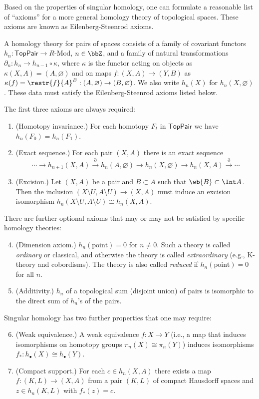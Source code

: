 Based on the properties of singular homology, one can formulate a reasonable list of ``axioms'' for a more general homology theory of topological spaces. These axioms are known as Eilenberg-Steenrod axioms.

\begin{defn}
    A homology theory for pairs of spaces consists of a family of covariant functors $h_n:\mathsf{TopPair}\to R\text{-Mod}$, $n\in\bbZ$, and a family of natural transformations $\partial_n:h_n\to h_{n-1}\circ\kappa$, where $\kappa$ is the functor acting on objects as $\kappa(X,A)=(A,\varnothing)$ and on maps $f:(X,A)\to (Y,B)$ as $\kappa(f)=\restr{f}{A}^B:(A,\varnothing)\to (B,\varnothing)$. We also write $h_n(X)$ for $h_n(X,\varnothing)$. These data must satisfy the Eilenberg-Steenrod axioms listed below.
\end{defn}

The first three axioms are always required:
\begin{enumerate}
    \item (Homotopy invariance.) For each homotopy $F_t$ in $\mathsf{TopPair}$ we have $h_n(F_0)=h_n(F_1)$.
    \item (Exact sequence.) For each pair $(X,A)$ there is an exact sequence
    \[\cdots\to h_{n+1}(X,A)\overset{\partial}\to h_n(A,\varnothing)\to h_n(X,\varnothing)\to h_n(X,A)\overset\partial\to\cdots\]
    \item (Excision.) Let $(X,A)$ be a pair and $B\subset A$ such that $\wb{B}\subset \Int A$. Then the inclusion $(X\setminus U,A\setminus U)\to (X,A)$ must induce an excision isomorphism $h_n(X\setminus U,A\setminus U)\cong h_n(X,A)$.
\end{enumerate}

There are further optional axioms that may or may not be satisfied by specific homology theories:
\begin{enumerate}
    \setcounter{enumi}{3}
    \item (Dimension axiom.) $h_n(\text{point})=0$ for $n\neq 0$. Such a theory is called \emph{ordinary} or classical, and otherwise the theory is called \emph{extraordinary} (e.g., K-theory and cobordisms). The theory is also called \emph{reduced} if $h_n(\text{point})=0$ for all $n$.
    \item (Additivity.) $h_n$ of a topological sum (disjoint union) of pairs is isomorphic to the direct sum of $h_n$'s of the pairs.
\end{enumerate}
Singular homology has two further properties that one may require:
\begin{enumerate}
    \setcounter{enumi}{5}
     \item (Weak equivalence.) A weak equivalence $f:X\to Y$ (i.e., a map that induces isomorphisms on homotopy groups $\pi_n(X)\cong \pi_n(Y)$) induces isomorphisms $f_\ast:h_\bullet(X)\cong h_\bullet(Y)$.
    \item (Compact support.)  For each $c\in h_n(X,A)$ there exists a map $f:(K,L)\to (X,A)$ from a pair $(K,L)$ of compact Hausdorff spaces and $z\in h_n(K,L)$ with $f_\ast(z)=c$.
\end{enumerate}   

